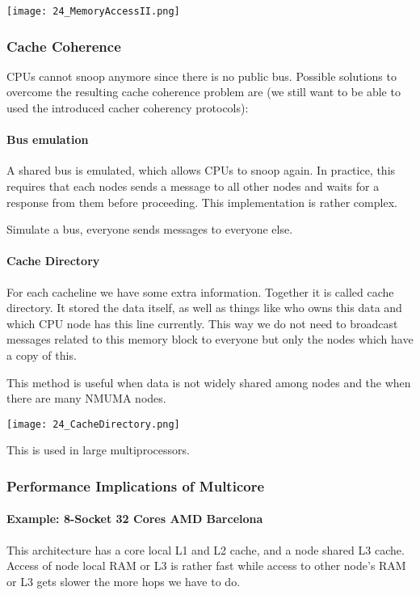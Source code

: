 \texttt{[image: 24\_MemoryAccessII.png]}

\subsubsection{Cache Coherence}
CPUs cannot snoop anymore since there is no public bus. Possible solutions to overcome the resulting cache coherence problem are (we still want to be able to used the introduced cacher coherency protocols):

\paragraph{Bus emulation}
A shared bus is emulated, which allows CPUs to snoop again. In practice, this requires that each nodes sends a message to all other nodes and waits for a response from them before proceeding. This implementation is rather complex.

Simulate a bus, everyone sends messages to everyone else. 

\paragraph{Cache Directory}
For each cacheline we have some extra information. Together it is called cache directory. It stored the data itself, as well as things like who owns this data and which CPU node has this line currently. This way we do not need to broadcast messages related to this memory block to everyone but only the nodes which have a copy of this.

This method is useful when data is not widely shared among nodes and the when there are many NMUMA nodes. 

\texttt{[image: 24\_CacheDirectory.png]}

This is used in large multiprocessors.

\subsubsection{Performance Implications of Multicore}

\paragraph{Example: 8-Socket 32 Cores AMD Barcelona}
This architecture has a core local L1 and L2 cache, and a node shared L3 cache. Access of node local RAM or L3 is rather fast while access to other node's RAM or L3 gets slower the more hops we have to do. 

